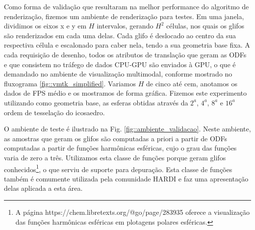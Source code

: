 \documentclass[
    12pt,                %
    oneside,            %
    a4paper,            %
    english,            %
    french,                %
    spanish,            %
    brazil                %
    ]{abntex2}
\begin{document}
Como forma de validação que resultaram na melhor performance do algoritmo de renderização, fizemos um ambiente de renderização para testes. Em uma janela, dividimos os eixos x e y em $H$ intervalos, gerando $H^2$ células, nos quais os glifos são renderizados em cada uma delas. Cada glifo é deslocado ao centro da sua respectiva célula e escalonado para caber nela, tendo a sua geometria base fixa. A cada requisição de desenho, todos os atributos de translação que geram as ODFs e que consistem no tráfego de dados CPU-GPU são enviados à GPU, o que é demandado no ambiente de visualização multimodal, conforme mostrado no fluxograma \ref{fig::vmtk_simplified}. Variamos $H$ de cinco até cem, anotamos os dados de FPS médio e os mostramos de forma gráfica. Fizemos este experimento utilizando como geometria base, as esferas obtidas através da $2^a$, $4^a$, $8^a$ e $16^a$ ordem de tesselação do icosaedro.



O ambiente de teste é ilustrado na Fig. \ref{fig::ambiente_validacao}. Neste ambiente, as amostras que geram os glifos são computadas a priori a partir de ODFs computadas a partir de funções harmônicas esféricas, cujo o grau das funções varia de zero a três. Utilizamos esta classe de funções porque geram glifos conhecidos\footnote{A página https://chem.libretexts.org/@go/page/283935 oferece a visualização das funções harmônicas esféricas em plotagens polares esféricas.}, o que serviu de suporte para depuração. Esta classe de funções também é comumente utilizada pela comunidade HARDI e  faz uma apresentação delas aplicada a esta área.
\end{document}
